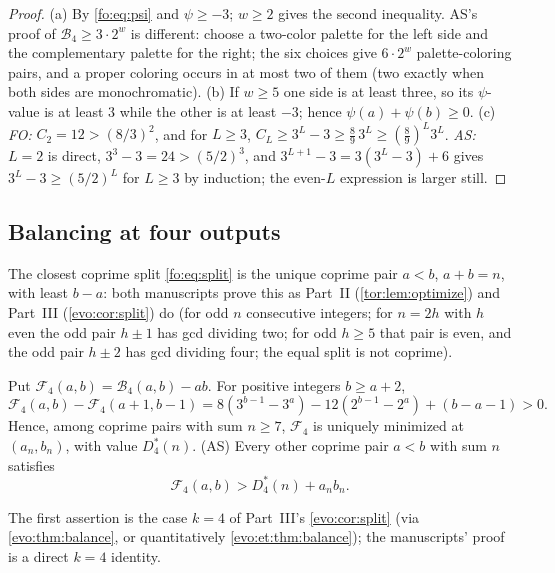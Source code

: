 \documentclass[11pt,a4paper]{article}
\numberwithin{equation}{section}
\theoremstyle{definition}
\theoremstyle{remark}
\newcommand{\Bip}{\mathcal B}
\begin{document}
\begin{proof}
(a) By \eqref{fo:eq:psi} and $\psi\ge-3$; $w\ge2$ gives the second inequality.
AS's proof of $\Bip_4\ge3\cdot2^w$ is different: choose a two-color palette for
the left side and the complementary palette for the right; the six choices
give $6\cdot2^w$ palette-coloring pairs, and a proper coloring occurs in at
most two of them (two exactly when both sides are monochromatic).
(b) If $w\ge5$ one side is at least three, so its $\psi$-value is at least
$3$ while the other is at least $-3$; hence $\psi(a)+\psi(b)\ge0$.
(c) \emph{FO:} $C_2=12>(8/3)^2$, and for $L\ge3$,
$C_L\ge3^L-3\ge\frac89\,3^L\ge(\frac89)^L3^L$. \emph{AS:} $L=2$ is direct,
$3^3-3=24>(5/2)^3$, and $3^{L+1}-3=3(3^L-3)+6$ gives $3^L-3\ge(5/2)^L$ for
$L\ge3$ by induction; the even-$L$ expression is larger still.
\end{proof}

\subsection{Balancing at four outputs}\label{fo:sec:balance}

The closest coprime split \eqref{fo:eq:split} is the unique coprime pair
$a<b$, $a+b=n$, with least $b-a$: both manuscripts prove this as Part~II
(\cref{tor:lem:optimize}) and Part~III (\cref{evo:cor:split}) do (for odd
$n$ consecutive integers; for $n=2h$ with $h$ even the odd pair $h\pm1$ has
gcd dividing two; for odd $h\ge5$ that pair is even, and the odd pair $h\pm2$
has gcd dividing four; the equal split is not coprime).

\begin{lemma}\label{fo:lem:balance}
Put $\mathcal F_4(a,b)=\Bip_4(a,b)-ab$. For positive integers $b\ge a+2$,
\begin{equation}\label{fo:eq:balance}
 \mathcal F_4(a,b)-\mathcal F_4(a+1,b-1)
 =8(3^{b-1}-3^a)-12(2^{b-1}-2^a)+(b-a-1)>0.
\end{equation}
Hence, among coprime pairs with sum $n\ge7$, $\mathcal F_4$ is uniquely
minimized at $(a_n,b_n)$, with value $D^*_4(n)$. \textup{(AS)} Every other
coprime pair $a<b$ with sum $n$ satisfies
\begin{equation}\label{fo:as:eq:balancegap}
 \mathcal F_4(a,b)>D^*_4(n)+a_nb_n.
\end{equation}
\end{lemma}

The first assertion is the case $k=4$ of Part~III's \cref{evo:cor:split}
(via \cref{evo:thm:balance}, or quantitatively \cref{evo:et:thm:balance});
the manuscripts' proof is a direct $k=4$ identity.
\end{document}

